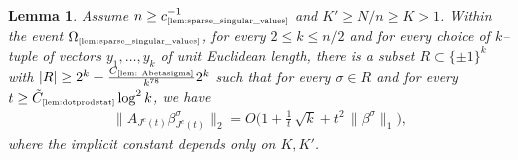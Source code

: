 \documentclass[11pt]{amsart}
\newtheorem{lemma}[theorem]{Lemma}
\theoremstyle{definition}
\theoremstyle{plain}
\begin{document}
\begin{lemma}
\label{lem: Abetasigma}
Assume $n\geq c_{\text{\tiny\ref{lem:sparse_singular_values}}}^{-1}$
and
$K'\geq N/n\geq K>1$.
Within the event $\Omega_{\text{\tiny\ref{lem:sparse_singular_values}}}$,
for every $2\leq k\leq n/2$ and
for every choice of $k$--tuple of vectors $y_1,\dots,y_k$
of unit Euclidean length,
there is a subset  
  $ R \subset \{\pm1\}^{k}$
  with $|R| \ge 2^k -
  \frac{C_{\text{\tiny\ref{lem: Abetasigma}}}}{k^{78}}2^k$ 
  such that for every $\sigma \in R$ and
  for every $t\geq
\tilde C_{\text{\tiny\ref{lem:dotprodstat}}}
\log^{2} k$,
we have
  \begin{align*}
    \Big\|A_{ J^c(t)} \beta_{J^c(t)}^\sigma\Big\|_2 
    =  
    O\bigg(1
 +
 \frac{1}{t}\,\sqrt{k}
  + t^2\,\|\beta^\sigma\|_1\bigg),
  \end{align*}
  where the implicit constant depends only on $K,K'$.
\end{lemma}
\end{document}
